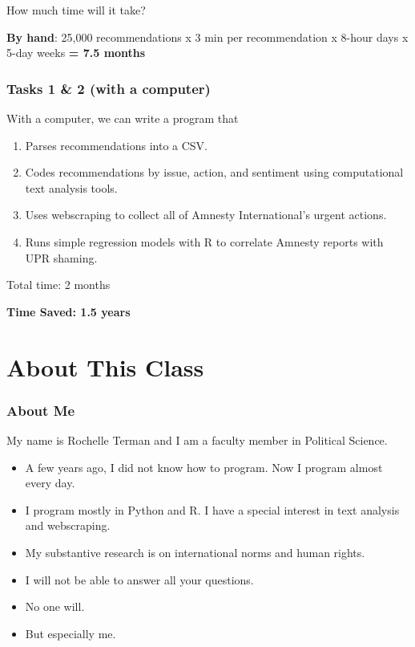 \documentclass[]{book}
\providecommand{\tightlist}{%
  \setlength{\itemsep}{0pt}\setlength{\parskip}{0pt}}
\begin{document}
How much time will it take?

\textbf{By hand}: 25,000 recommendations x 3 min per recommendation x
8-hour days x 5-day weeks \textbf{= 7.5 months}

\subsubsection*{Tasks 1 \& 2 (with a
computer)}\label{tasks-1-2-with-a-computer}

With a computer, we can write a program that

\begin{enumerate}
\def\labelenumi{\arabic{enumi}.}
\tightlist
\item
  Parses recommendations into a CSV.
\item
  Codes recommendations by issue, action, and sentiment using
  computational text analysis tools.
\item
  Uses webscraping to collect all of Amnesty International's urgent
  actions.
\item
  Runs simple regression models with R to correlate Amnesty reports with
  UPR shaming.
\end{enumerate}

Total time: 2 months

\textbf{Time Saved: 1.5 years}

\section{About This Class}\label{about-this-class}

\subsubsection*{About Me}\label{about-me}

My name is Rochelle Terman and I am a faculty member in Political
Science.

\begin{itemize}
\tightlist
\item
  A few years ago, I did not know how to program. Now I program almost
  every day.
\item
  I program mostly in Python and R. I have a special interest in text
  analysis and webscraping.
\item
  My substantive research is on international norms and human rights.
\item
  I will not be able to answer all your questions.
\item
  No one will.
\item
  But especially me.
\end{itemize}
\end{document}
